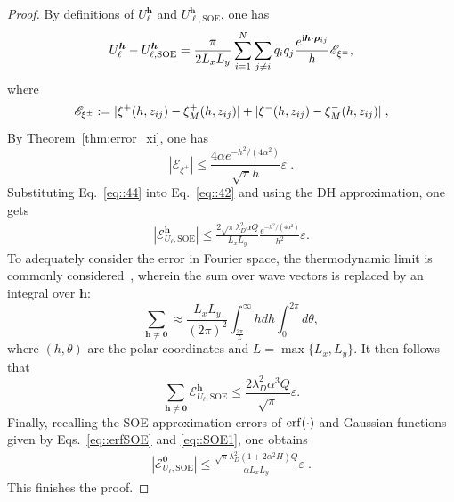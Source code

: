 \begin{proof}
	By definitions of $U_{\ell}^{\bm{h}}$ and $U_{\ell,\text{SOE}}^{\bm{h}}$, one has
	\begin{equation}\label{eq::42}
		U_{\ell}^{\bm{h}}-U_{\ell,\text{SOE}}^{\bm{h}}= \frac{\pi}{2 L_xL_y}\sum_{i=1}^{N}\sum_{j\neq i}q_{i}q_{j}\frac{e^{\mathrm{i} \bm{h}\cdot\bm{\rho}_{ij}}}{h}\mathscr{E}_{\xi^{\pm}},
	\end{equation}
	where 
	\begin{equation}\label{eq::44}
		\mathscr{E}_{\xi^{\pm}} := \lvert\xi^{+}(h,z_{ij})-\xi_{M}^{+}(h,z_{ij})\rvert + \lvert\xi^{-}(h,z_{ij})-\xi_{M}^{-}(h,z_{ij})\rvert\;,
	\end{equation}
	By Theorem~\ref{thm:error_xi}, one has
	\begin{equation}
		|\mathscr{E}_{\xi^{\pm}}|\leq\frac{4\alpha e^{-h^2/(4\alpha^2)}}{\sqrt{\pi}h}\varepsilon\;.
	\end{equation}
	Substituting Eq.~\eqref{eq::44} into Eq.~\eqref{eq::42} and using the DH approximation, one gets
	\begin{equation}\label{eq::47}
		\begin{split}   
			\left| \mathscr{E}_{U_{\ell},\text{SOE}}^{\bm{h}} \right| \leq \frac{2\sqrt{\pi} \lambda_D^2 \alpha Q}{L_x L_y} \frac{e^{-h^2 / (4\alpha^2)}}{h^2} \varepsilon.
		\end{split}
	\end{equation}
	To adequately consider the error in Fourier space, the thermodynamic limit is commonly considered~\cite{kolafa1992cutoff,deserno1998mesh}, wherein the sum over wave vectors is replaced by an integral over $\bm{h}$:
	\begin{equation}\label{eq::integral2}
		\sum_{\bm{h}\neq\bm{0}}\approx \frac{L_xL_y}{(2\pi)^2}\int_{\frac{2\pi}{L}}^{\infty}h dh\int_{0}^{2\pi}d\theta,
	\end{equation}
	where $(h,\theta)$ are the polar coordinates and $L=\max\{L_x,L_y\}$. It then follows that
	\begin{equation}
		\sum_{\bm{h}\neq\bm{0}}\mathscr{E}_{U_{\ell},\text{SOE}}^{ \bm{h}}\leq \frac{2\lambda_D^2\alpha^3Q}{\sqrt{\pi}}\varepsilon.
	\end{equation}
	Finally, recalling the SOE approximation errors of $\operatorname{erf}(\cdot)$ and Gaussian functions given by Eqs.~\eqref{eq::erfSOE} and \eqref{eq::SOE1}, one obtains 
	\begin{equation}
		\begin{split}  
			\left|\mathscr{E}_{U_{\ell},\text{SOE}}^{\bm{0}}\right|\leq \frac{\sqrt{\pi} \lambda_D^2 (1+2\alpha^2H)Q}{\alpha L_xL_y}\varepsilon\;.
		\end{split}
	\end{equation}
	This finishes the proof.
	
\end{proof}

